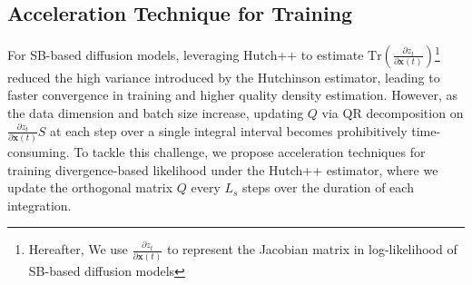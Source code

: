 \vspace{-1mm}
\subsection{Acceleration Technique for Training}\label{sec: acceleration}

\vspace{-1mm}
For SB-based diffusion models, leveraging Hutch++ to estimate $\mathrm{Tr}\left(\frac{\partial z_t}{\partial \mathbf{x}(t)}\right)$\footnote{Hereafter, We use $\frac{\partial z_t}{\partial \mathbf{x}(t)}$ to represent the Jacobian matrix in log-likelihood of SB-based diffusion models} reduced the high variance introduced by the Hutchinson estimator, leading to faster convergence in training and higher quality density estimation.
However, as the data dimension and batch size increase, updating $Q$ via QR decomposition on $\frac{\partial z_t}{\partial \mathbf{x}(t)} S$ at each step over a single integral interval becomes prohibitively time-consuming.
To tackle this challenge, we propose acceleration techniques for training divergence-based likelihood under the Hutch++ estimator, where we update the orthogonal matrix $Q$ every $L_s$ steps over the duration of each integration.

